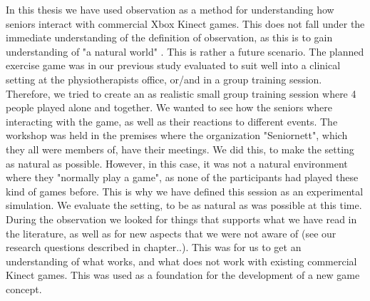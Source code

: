 In this thesis we have used observation as a method for understanding how seniors interact with commercial Xbox Kinect games. This does not fall under the immediate understanding of the definition of observation, as this is to gain understanding of "a natural world" \cite{tjora}. This is rather a future scenario. The planned exercise game was in our previous study \cite{project} evaluated to suit well into a clinical setting at the physiotherapists office, or/and in a group training session. Therefore, we tried to create an as realistic small group training session where 4 people played alone and together.  We wanted to see how the seniors where interacting with the game, as well as their reactions to different events. The workshop was held in the premises where the organization "Seniornett", which they all were members of, have their meetings. We did this, to make the setting as natural as possible.  However, in this case, it was not a natural environment where they "normally play a game", as none of the participants had played these kind of games before. This is why we have defined this session as an experimental simulation. We evaluate the setting, to be as natural as was possible at this time.  During the observation we looked for things that supports what we have read in the literature, as well as for new aspects that we were not aware of (see our research questions described in chapter..). This was for us to get an understanding of what works, and what does not work with existing commercial Kinect games. This was used as a foundation for the development of a new game concept. 

